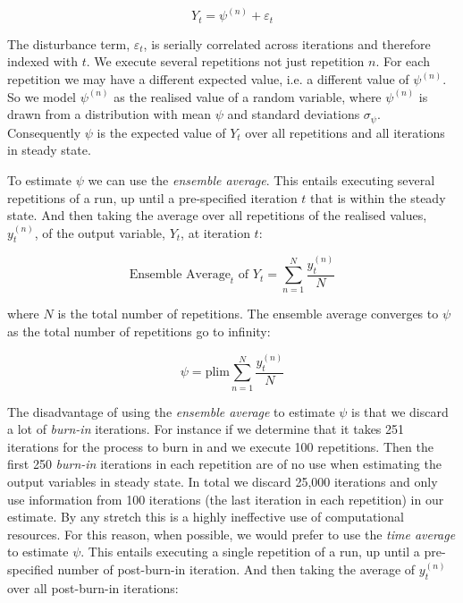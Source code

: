 \documentclass[preprint, 12pt]{elsarticle}
\begin{document}
\begin{equation}
Y_t = \psi^{(n)} + \varepsilon_t
\label{eq:process}
\end{equation}

The disturbance term, $\varepsilon_t$, is serially correlated across iterations and therefore indexed with $t$. We execute several repetitions not just repetition $n$. For each repetition we may have a different expected value, i.e. a different value of $\psi^{(n)}$. So we model $\psi^{(n)}$ as the realised value of a random variable, where $\psi^{(n)}$ is drawn from a distribution with mean $\psi$ and standard deviations $\sigma_\psi$. Consequently $\psi$ is the expected value of $Y_t$ over all repetitions and all iterations in steady state. 

To estimate $\psi$ we can use the \emph{ensemble average}. This entails executing several repetitions of a run, up until a pre-specified iteration $t$ that is within the steady state. And then taking the average over all repetitions of the realised values, $y_t^{(n)}$, of the output variable, $Y_t$, at iteration $t$:

\begin{equation}
\mbox{Ensemble Average}_t \mbox{ of } Y_t = \sum\limits_{n = 1}^N {\frac{ y_t^{(n)} }{ N }}
\end{equation}

where $N$ is the total number of repetitions. The ensemble average converges to $\psi$ as the total number of repetitions go to infinity:

$$\psi = \mbox{plim} \sum\limits_{n = 1}^N {\frac{ y_t^{(n)} }{ N }}$$

The disadvantage of using the \emph{ensemble average} to estimate $\psi$ is that we discard a lot of \emph{burn-in} iterations. For instance if we determine that it takes 251 iterations for the process to burn in and we execute 100 repetitions. Then the first 250 \emph{burn-in} iterations in each repetition are of no use when estimating the output variables in steady state. In total we discard 25,000 iterations and only use information from 100 iterations (the last iteration in each repetition) in our estimate. By any stretch this is a highly ineffective use of computational resources. For this reason, when possible, we would prefer to use the \emph{time average} to estimate $\psi$. This entails executing a single repetition of a run, up until a pre-specified number of post-burn-in iteration. And then taking the average of $y_t^{(n)}$ over all post-burn-in iterations:
\end{document}
